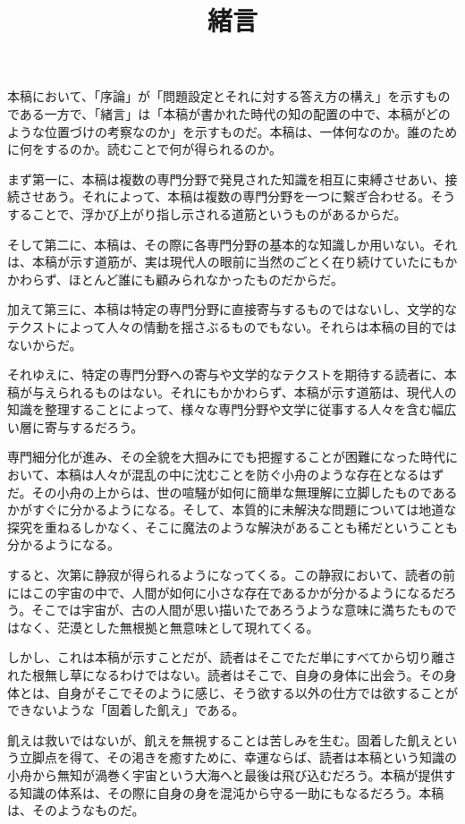 \documentclass[8pt, a5paper]{ltjsarticle}
\title{緒言}
\author{}
\date{}
\author{}
\date{}
\begin{document}
\maketitle

本稿において、「序論」が「問題設定とそれに対する答え方の構え」を示すものである一方で、「緒言」は「本稿が書かれた時代の知の配置の中で、本稿がどのような位置づけの考察なのか」を示すものだ。本稿は、一体何なのか。誰のために何をするのか。読むことで何が得られるのか。

まず第一に、本稿は複数の専門分野で発見された知識を相互に束縛させあい、接続させあう。それによって、本稿は複数の専門分野を一つに繋ぎ合わせる。そうすることで、浮かび上がり指し示される道筋というものがあるからだ。

そして第二に、本稿は、その際に各専門分野の基本的な知識しか用いない。それは、本稿が示す道筋が、実は現代人の眼前に当然のごとく在り続けていたにもかかわらず、ほとんど誰にも顧みられなかったものだからだ。

加えて第三に、本稿は特定の専門分野に直接寄与するものではないし、文学的なテクストによって人々の情動を揺さぶるものでもない。それらは本稿の目的ではないからだ。

それゆえに、特定の専門分野への寄与や文学的なテクストを期待する読者に、本稿が与えられるものはない。それにもかかわらず、本稿が示す道筋は、現代人の知識を整理することによって、様々な専門分野や文学に従事する人々を含む幅広い層に寄与するだろう。

専門細分化が進み、その全貌を大掴みにでも把握することが困難になった時代において、本稿は人々が混乱の中に沈むことを防ぐ小舟のような存在となるはずだ。その小舟の上からは、世の喧騒が如何に簡単な無理解に立脚したものであるかがすぐに分かるようになる。そして、本質的に未解決な問題については地道な探究を重ねるしかなく、そこに魔法のような解決があることも稀だということも分かるようになる。

すると、次第に静寂が得られるようになってくる。この静寂において、読者の前にはこの宇宙の中で、人間が如何に小さな存在であるかが分かるようになるだろう。そこでは宇宙が、古の人間が思い描いたであろうような意味に満ちたものではなく、茫漠とした無根拠と無意味として現れてくる。

しかし、これは本稿が示すことだが、読者はそこでただ単にすべてから切り離された根無し草になるわけではない。読者はそこで、自身の身体に出会う。その身体とは、自身がそこでそのように感じ、そう欲する以外の仕方では欲することができないような「固着した飢え」である。

飢えは救いではないが、飢えを無視することは苦しみを生む。固着した飢えという立脚点を得て、その渇きを癒すために、幸運ならば、読者は本稿という知識の小舟から無知が渦巻く宇宙という大海へと最後は飛び込むだろう。本稿が提供する知識の体系は、その際に自身の身を混沌から守る一助にもなるだろう。本稿は、そのようなものだ。
\end{document}
